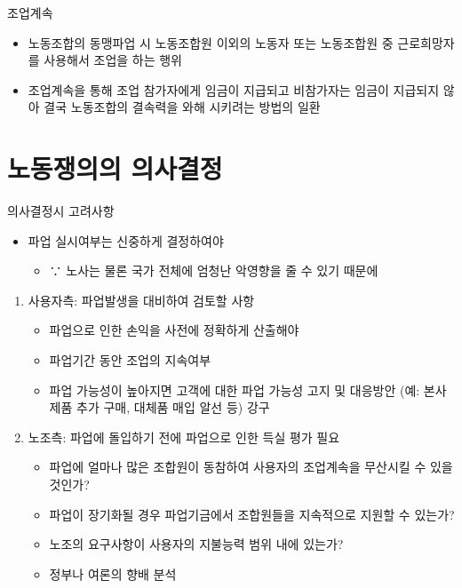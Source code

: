 \documentclass[aspectratio=169,xcolor=dvipsnames,handout]{beamer}
\begin{document}
\begin{frame}{조업계속}
    \begin{itemize}[<+->]
        \item 노동조합의 동맹파업 시 노동조합원 이외의 노동자 또는 노동조합원 중 근로희망자를 사용해서 조업을 하는 행위
        \item 조업계속을 통해 조업 참가자에게 임금이 지급되고 비참가자는 임금이 지급되지 않아 결국 노동조합의 결속력을 와해 시키려는 방법의 일환
    \end{itemize}
\end{frame}

\section{노동쟁의의 의사결정}

\begin{frame}[allowframebreaks]{의사결정시 고려사항}
    \begin{itemize}[<+->]
        \item 파업 실시여부는 신중하게 결정하여야 
        \begin{itemize}[<+->]
            \item ∵ 노사는 물론 국가 전체에 엄청난 악영향을 줄 수 있기 때문에
        \end{itemize}
    \end{itemize}
    \begin{enumerate}[<+->]
            \item 사용자측: 파업발생을 대비하여 검토할 사항
        \begin{itemize}[<+->]
            \item 파업으로 인한 손익을 사전에 정확하게 산출해야
            \item 파업기간 동안 조업의 지속여부
            \item 파업 가능성이 높아지면 고객에 대한 파업 가능성 고지 및 대응방안 (예: 본사제품 추가 구매, 대체품 매입 알선 등) 강구
    \framebreak\relax
        \end{itemize}
        \item 노조측: 파업에 돌입하기 전에 파업으로 인한 득실 평가 필요
        \begin{itemize}[<+->]
            \item 파업에 얼마나 많은 조합원이 동참하여 사용자의 조업계속을 무산시킬 수 있을 것인가?
            \item 파업이 장기화될 경우 파업기금에서 조합원들을 지속적으로 지원할 수 있는가?
            \item 노조의 요구사항이 사용자의 지불능력 범위 내에 있는가?
            \item 정부나 여론의 향배 분석
        \end{itemize}
    \end{enumerate}
\end{frame}
\end{document}
